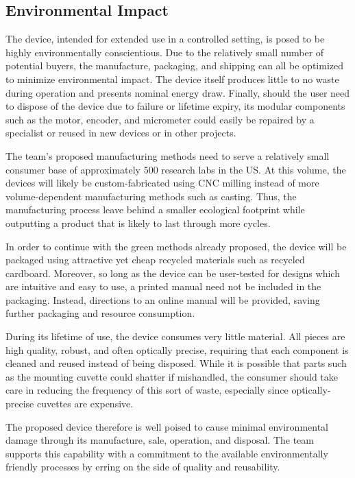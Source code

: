 \documentclass{article}
\begin{document}
\subsection{Environmental Impact}
\label{sec:environment}
 
The device, intended for extended use in a controlled setting, is
posed to be highly environmentally conscientious. Due to the
relatively small number of potential buyers, the manufacture,
packaging, and shipping can all be optimized to minimize environmental
impact. The device itself produces little to no waste during operation
and presents nominal energy draw. Finally, should the user need to
dispose of the device due to failure or lifetime expiry, its modular
components such as the motor, encoder, and micrometer could easily be
repaired by a specialist or reused in new devices or in other
projects.
 
The team's proposed manufacturing methods need to serve a relatively
small consumer base of approximately 500 research labs in the US. At
this volume, the devices will likely be custom-fabricated using CNC
milling instead of more volume-dependent manufacturing methods such as
casting. Thus, the manufacturing process leave behind a smaller
ecological footprint while outputting a product that is likely to last
through more cycles.
 
In order to continue with the green methods already proposed, the
device will be packaged using attractive yet cheap recycled materials
such as recycled cardboard. Moreover, so long as the device can be
user-tested for designs which are intuitive and easy to use, a printed
manual need not be included in the packaging. Instead, directions to
an online manual will be provided, saving further packaging and
resource consumption.
 
During its lifetime of use, the device consumes very little
material. All pieces are high quality, robust, and often optically
precise, requiring that each component is cleaned and reused instead
of being disposed. While it is possible that parts such as the
mounting cuvette could shatter if mishandled, the consumer should take
care in reducing the frequency of this sort of waste, especially since
optically-precise cuvettes are expensive.
 
The proposed device therefore is well poised to cause minimal
environmental damage through its manufacture, sale, operation, and
disposal. The team supports this capability with a commitment to the
available environmentally friendly processes by erring on the
side of quality and reusability.
 
\end{document}
